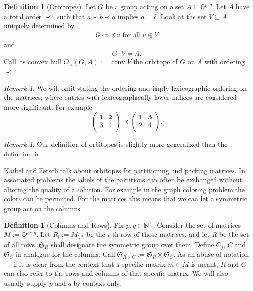 \documentclass[a4paper]{amsart}
\theoremstyle{lemma}
\theoremstyle{definition}
\newtheorem{defn}[theorem]{Definition}
\theoremstyle{remark}
\newtheorem{remark}[theorem]{Remark}
\DeclareMathOperator{\conv}{conv}
\newcommand{\lex}{\ensuremath{\prec}} %
\newcommand{\lr}[1]{\ensuremath{\left( #1 \right)}}
\newcommand{\naturals}{\ensuremath{\mathbb{N}}}
\newcommand{\rationals}{\ensuremath{\mathbb{Q}}}
\newcommand{\Sym}{\ensuremath{\mathfrak{S}}}
\begin{document}
 \begin{defn}[Orbitopes]
   Let \(G\) be a group acting on a set \(A \subseteq \rationals^{p,q}\).  Let \(A\) have a total order \(\lex\), such that \(a\lex b \lex a\) implies \(a = b\).
   Look at the set \(V \subseteq A\) uniquely determined by
   \begin{align}
     \label{biggest}
       G \cdot v  \preceq v  \text{ for all } v \in V
     \end{align}
   and
   \begin{align}
     \label{complete}
     G \cdot V =  A \text{.}
   \end{align}
   Call its convex hull \(O_{\lex} \lr{G, A} := \conv{}  V\) the orbitope of
   \(G\) on \(A\) with ordering \(\lex\).  
 \end{defn}
\begin{remark}
  We will omit stating the ordering and imply lexicographic ordering
  on the matrices, where entries with lexicographically lower indices
  are considered more significant.  For example
  \[\lr{\begin{matrix}
      1 & \mathbf{2} \\
      3 & 4 \\
      \end{matrix}
    }
    \lex
    \lr{\begin{matrix}
      1 & \mathbf{3} \\
      2 & 4 \\
      \end{matrix}
    }\text{.}
  \]
\end{remark}
\begin{remark}
  Our definition of orbitopes is slightly more generalized than the definition in \cite{orbi}.
\end{remark}

Kaibel and Fetsch talk about orbitopes for partitioning and packing
matrices.  In associated problems the labels of the partitions can
often be exchanged without altering the quality of a solution.  For
example in the graph coloring problem the colors can be permuted.  For
the matrices this means that we can let a symmetric group act on the
columns.

\begin{defn}[Columns and Rows]
  Fix \(p, q \in \naturals^+\).  Consider the set of matrices \(M :=
  \mathbb{C}^{p \times q}\).  Let \(R_i := M_{i, *}\) be the \(i\)-th
  row of those matrices, and let \(R\) be the set of all rows.
  \(\Sym_R\) shall designate the symmetric group over them.  Define
  \(C_j\), \(C\) and \(\Sym_C\) in analogue for the columns.  Call
  \(\Sym_{R \times C} := \Sym_R \times \Sym_C\).  As an abuse of
  notation --- if it is clear from the context that a specific matrix
  \(m \in M\) is meant, \(R\) and \(C\) can also refer to the rows
  and columns of that specific matrix.  We will also usually supply \(p\)
  and \(q\) by context only.
\end{defn}
\end{document}
